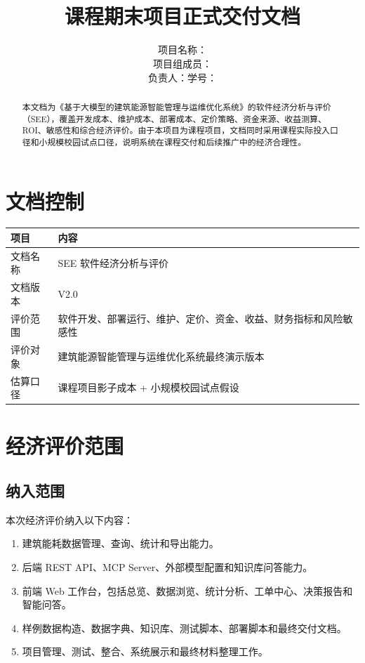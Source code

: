\documentclass[12pt,a4paper]{ctexart}
\title{
    \vspace{-2em}
    \heiti \zihao{2} \reporttitle \\
    \vspace{1em}
    \zihao{4} 课程期末项目正式交付文档
}
\author{
    \songti \zihao{4}
    项目名称：\projectname \\
    项目组成员：\teamname \\
    负责人：\studentname \quad 学号：\studentid
}
\date{\docdate}
\newcommand{\projectname}{基于大模型的建筑能源智能管理与运维优化系统}
\newcommand{\docversion}{V2.0}
\begin{document}
\maketitle
\thispagestyle{fancy}

\begin{abstract}
本文档为《\projectname》的软件经济分析与评价（SEE），覆盖开发成本、维护成本、部署成本、定价策略、资金来源、收益测算、ROI、敏感性和综合经济评价。由于本项目为课程项目，文档同时采用课程实际投入口径和小规模校园试点口径，说明系统在课程交付和后续推广中的经济合理性。
\end{abstract}

\tableofcontents
\newpage

\section{文档控制}
\begin{longtable}{p{4cm}p{10.5cm}}
\toprule
项目 & 内容 \\
\midrule
文档名称 & SEE 软件经济分析与评价 \\
文档版本 & \docversion \\
评价范围 & 软件开发、部署运行、维护、定价、资金、收益、财务指标和风险敏感性 \\
评价对象 & 建筑能源智能管理与运维优化系统最终演示版本 \\
估算口径 & 课程项目影子成本 + 小规模校园试点假设 \\
\bottomrule
\end{longtable}

\section{经济评价范围}
\subsection{纳入范围}
本次经济评价纳入以下内容：
\begin{enumerate}
    \item 建筑能耗数据管理、查询、统计和导出能力。
    \item 后端 REST API、MCP Server、外部模型配置和知识库问答能力。
    \item 前端 Web 工作台，包括总览、数据浏览、统计分析、工单中心、决策报告和智能问答。
    \item 样例数据构造、数据字典、知识库、测试脚本、部署脚本和最终交付文档。
    \item 项目管理、测试、整合、系统展示和最终材料整理工作。
\end{enumerate}
\end{document}
